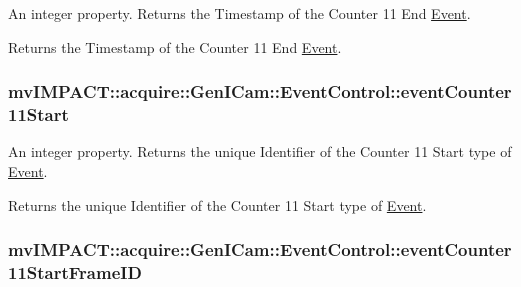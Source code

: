 An integer property. Returns the Timestamp of the Counter 11 End \hyperlink{classmv_i_m_p_a_c_t_1_1acquire_1_1_event}{Event}. 

Returns the Timestamp of the Counter 11 End \hyperlink{classmv_i_m_p_a_c_t_1_1acquire_1_1_event}{Event}. \hypertarget{classmv_i_m_p_a_c_t_1_1acquire_1_1_gen_i_cam_1_1_event_control_aae7e65741cc7d4e99445dc543d0243f7}{
\subsubsection[{event\+Counter11\+Start}]{ mv\+I\+M\+P\+A\+C\+T\+::acquire\+::\+Gen\+I\+Cam\+::\+Event\+Control\+::event\+Counter11\+Start}}\label{classmv_i_m_p_a_c_t_1_1acquire_1_1_gen_i_cam_1_1_event_control_aae7e65741cc7d4e99445dc543d0243f7}


An integer property. Returns the unique Identifier of the Counter 11 Start type of \hyperlink{classmv_i_m_p_a_c_t_1_1acquire_1_1_event}{Event}. 

Returns the unique Identifier of the Counter 11 Start type of \hyperlink{classmv_i_m_p_a_c_t_1_1acquire_1_1_event}{Event}. \hypertarget{classmv_i_m_p_a_c_t_1_1acquire_1_1_gen_i_cam_1_1_event_control_ac50eb18b1a1c111bc65b499df5f9f241}{
\subsubsection[{event\+Counter11\+Start\+Frame\+I\+D}]{ mv\+I\+M\+P\+A\+C\+T\+::acquire\+::\+Gen\+I\+Cam\+::\+Event\+Control\+::event\+Counter11\+Start\+Frame\+I\+D}}\label{classmv_i_m_p_a_c_t_1_1acquire_1_1_gen_i_cam_1_1_event_control_ac50eb18b1a1c111bc65b499df5f9f241}


